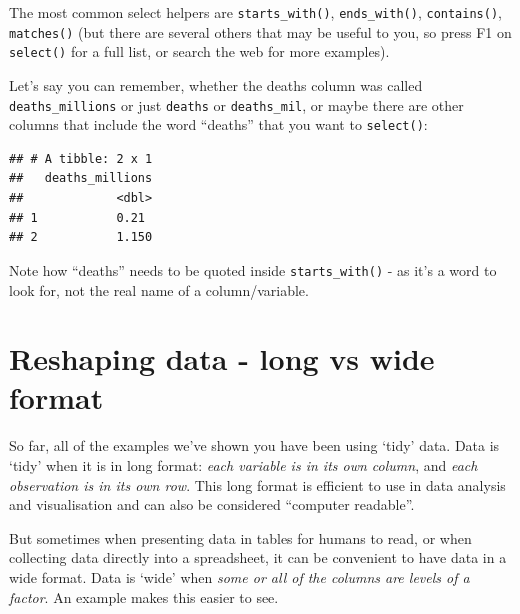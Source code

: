 \documentclass[
  12pt,
  krantz2]{krantz}
\makeatletter
\newenvironment{Shaded}{\begin{snugshade}}{\end{snugshade}}
\newcommand{\KeywordTok}[1]{\textcolor[rgb]{0.13,0.29,0.53}{\textbf{#1}}}
\newcommand{\NormalTok}[1]{#1}
\newcommand{\OperatorTok}[1]{\textcolor[rgb]{0.81,0.36,0.00}{\textbf{#1}}}
\newcommand{\StringTok}[1]{\textcolor[rgb]{0.31,0.60,0.02}{#1}}
\newenvironment{kframe}{%
\medskip{}
\setlength{\fboxsep}{.8em}
 \def\at@end@of@kframe{}%
 \ifinner\ifhmode%
  \def\at@end@of@kframe{\end{minipage}}%
  \begin{minipage}{\columnwidth}%
 \fi\fi%
 \def\FrameCommand##1{\hskip\@totalleftmargin \hskip-\fboxsep
 \colorbox{shadecolor}{##1}\hskip-\fboxsep
     \hskip-\linewidth \hskip-\@totalleftmargin \hskip\columnwidth}%
 \MakeFramed {\advance\hsize-\width
   \@totalleftmargin\z@ \linewidth\hsize
   \@setminipage}}%
 {\par\unskip\endMakeFramed%
 \at@end@of@kframe}
\renewenvironment{Shaded}{\begin{kframe}}{\end{kframe}}
\makeatother
\begin{document}
The most common select helpers are \texttt{starts\_with()}, \texttt{ends\_with()}, \texttt{contains()}, \texttt{matches()} (but there are several others that may be useful to you, so press F1 on \texttt{select()} for a full list, or search the web for more examples).

Let's say you can remember, whether the deaths column was called \texttt{deaths\_millions} or just \texttt{deaths} or \texttt{deaths\_mil}, or maybe there are other columns that include the word ``deaths'' that you want to \texttt{select()}:

\begin{Shaded}
\end{Shaded}

\begin{verbatim}
## # A tibble: 2 x 1
##   deaths_millions
##             <dbl>
## 1           0.21 
## 2           1.150
\end{verbatim}

Note how ``deaths'' needs to be quoted inside \texttt{starts\_with()} - as it's a word to look for, not the real name of a column/variable.

\hypertarget{reshaping-data---long-vs-wide-format}{%
\section{Reshaping data - long vs wide format}\label{reshaping-data---long-vs-wide-format}}


So far, all of the examples we've shown you have been using `tidy' data.
Data is `tidy' when it is in long format: \emph{each variable is in its own column}, and \emph{each observation is in its own row}.
This long format is efficient to use in data analysis and visualisation and can also be considered ``computer readable''.

But sometimes when presenting data in tables for humans to read, or when collecting data directly into a spreadsheet, it can be convenient to have data in a wide format.
Data is `wide' when \emph{some or all of the columns are levels of a factor}.
An example makes this easier to see.
\end{document}
